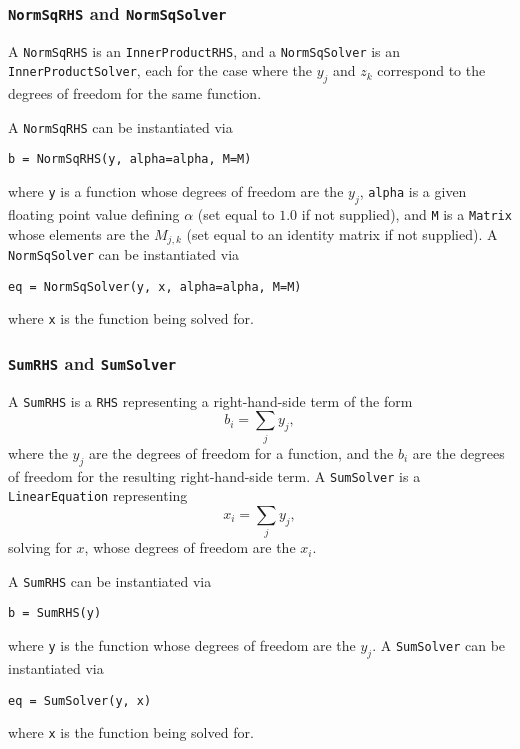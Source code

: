 \documentclass[11pt]{article}
\begin{document}
\subsubsection{\texttt{NormSqRHS} and \texttt{NormSqSolver}}

A \texttt{NormSqRHS} is an \texttt{InnerProductRHS}, and a
\texttt{NormSqSolver} is an \texttt{InnerProductSolver}, each for the case
where the $y_j$ and $z_k$ correspond to the degrees of freedom for the same
function.

A \texttt{NormSqRHS} can be instantiated via
\begin{lstlisting}
b = NormSqRHS(y, alpha=alpha, M=M)
\end{lstlisting}
where \texttt{y} is a function whose degrees of freedom are the $y_j$,
\texttt{alpha} is a given floating point value defining $\alpha$ (set equal to
$1.0$ if not supplied), and \texttt{M} is a \texttt{Matrix} whose elements are
the $M_{j,k}$ (set equal to an identity matrix if not supplied). A
\texttt{NormSqSolver} can be instantiated via
\begin{lstlisting}
eq = NormSqSolver(y, x, alpha=alpha, M=M)
\end{lstlisting}
where \texttt{x} is the function being solved for.

\subsubsection{\texttt{SumRHS} and \texttt{SumSolver}}

A \texttt{SumRHS} is a \texttt{RHS} representing a right-hand-side term of the
form
\begin{equation*}
  b_i = \sum_j y_j,
\end{equation*}
where the $y_j$ are the degrees of freedom for a function, and the $b_i$ are
the degrees of freedom for the resulting right-hand-side term. A
\texttt{SumSolver} is a \texttt{LinearEquation} representing
\begin{equation*}
  x_i = \sum_j y_j,
\end{equation*}
solving for $x$, whose degrees of freedom are the $x_i$.

A \texttt{SumRHS} can be instantiated via
\begin{lstlisting}
b = SumRHS(y)
\end{lstlisting}
where \texttt{y} is the function whose degrees of freedom are the $y_j$. A
\texttt{SumSolver} can be instantiated via
\begin{lstlisting}
eq = SumSolver(y, x)
\end{lstlisting}
where \texttt{x} is the function being solved for.
\end{document}
